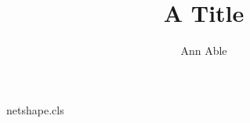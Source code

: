 \begin{filecontents*}[overwrite]{netshape.cls}
\def\@anames{}\def\@pacs{}\def\@recd{}
\newtoks\email@toks
\renewcommand\author[1]{\gdef\@anames{#1}}
\newcommand\emailAdd[1]{\email@toks=\expandafter{\the\email@toks#1}}
\newcommand\Pacs[1]{\gdef\@pacs{\ignorespaces#1}}
\newcommand\recd[1]{\gdef\@recd{\ignorespaces#1}}
\renewcommand\@author{\@anames\\E-mail: \the\email@toks\\PACS: \@pacs\\Received: \@recd}
\end{filecontents*}
\documentclass{netshape}

\title{A Title}
\author{Ann Able}
\maketitle
Text.

